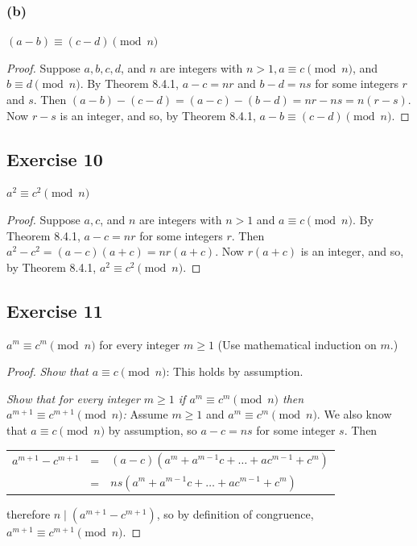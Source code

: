\documentclass[14pt]{extarticle}
\begin{document}
\subsubsection{(b)}
\((a - b) \equiv (c - d) \pmod n\)

\begin{proof}
        Suppose \(a, b, c, d\), and \(n\) are integers with \(n > 1, a \equiv c \pmod n\), and \(b \equiv d \pmod n\). By
        Theorem 8.4.1, \(a - c = nr\) and \(b - d = ns\) for some integers \(r\) and \(s\). Then \((a - b) - (c - d) =
        (a - c) - (b - d) = nr - ns = n(r - s)\). Now \(r - s\) is an integer, and so, by Theorem 8.4.1,
        \(a - b \equiv (c - d) \pmod n\).
\end{proof}

\subsection{Exercise 10}
\(a^2 \equiv c^2 \pmod n\)

\begin{proof}
        Suppose \(a, c\), and \(n\) are integers with \(n > 1\) and \(a \equiv c \pmod n\). By Theorem 8.4.1, \(a - c = nr\)
        for some integers \(r\). Then \(a^2-c^2 = (a-c)(a+c) = nr(a+c)\). Now \(r(a+c)\) is an integer, and so, by Theorem
        8.4.1, \(a^2 \equiv c^2 \pmod n\).
\end{proof}

\subsection{Exercise 11}
\(a^m \equiv c^m \pmod n\) for every integer \(m \geq 1\) (Use mathematical induction on \(m\).)

\begin{proof}
        {\it Show that \(a \equiv c \pmod n\)}: This holds by assumption.

                {\it Show that for every integer \(m \geq 1\) if \(a^m \equiv c^m \pmod n\) then \(a^{m+1} \equiv c^{m+1} \pmod
                        n\):} Assume \(m \geq 1\) and \(a^m \equiv c^m \pmod n\). We also know that \(a \equiv c \pmod n\) by assumption, so
        \(a-c = ns\) for some integer $s$. Then

        \begin{center}
                \begin{tabular}{rcl}
                        \(a^{m+1} - c^{m+1}\) & = & \((a-c)(a^{m} + a^{m-1}c + \ldots + ac^{m-1} + c^{m})\) \\
                                              & = & \(ns(a^{m} + a^{m-1}c + \ldots + ac^{m-1} + c^{m})\)    \\
                \end{tabular}
        \end{center}

        therefore \(n \mid (a^{m+1}-c^{m+1})\), so by definition of congruence, \(a^{m+1} \equiv c^{m+1} \pmod n\).
\end{proof}
\end{document}
